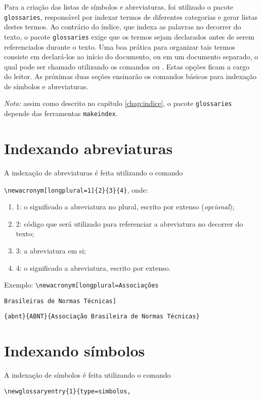 \documentclass{fei}
\begin{document}
	Para a criação das listas de símbolos e abreviaturas, foi utilizado o pacote \verb+glossaries+, responsável por indexar termos de diferentes categorias e gerar listas destes termos. Ao contrário do índice, que indexa as palavras no decorrer do texto, o pacote \verb+glossaries+ exige que os termos sejam declarados antes de serem referenciados durante o texto. Uma boa prática para organizar tais termos consiste em declará-los ao início do documento, ou em um documento separado, o qual pode ser chamado utilizando os comandos \verb++ ou \verb++. Estas opções ficam a cargo do leitor. As próximas duas seções ensinarão os comandos básicos para indexação de símbolos e abreviaturas.
	
	\emph{Nota:} assim como descrito no capítulo \ref{chap:indice}, o pacote \texttt{glossaries} depende das ferramentas \texttt{makeindex}.
	
	\section{Indexando abreviaturas}
	
	A indexação de abreviaturas é feita utilizando o comando
	
	\verb+\newacronym[longplural=1]{2}{3}{4}+, onde:
	
	\begin{enumerate}
	\item 1: o significado a abreviatura no plural, escrito por extenso (\emph{opcional});
	\item 2: código que será utilizado para referenciar a abreviatura no decorrer do texto;
	\item 3: a abreviatura em si;
	\item 4: o significado a abreviatura, escrito por extenso.
	\end{enumerate}
	
	Exemplo: \verb+\newacronym[longplural=Associações+
	
			 \verb+Brasileiras de Normas Técnicas]+
			 
			 \verb+{abnt}{ABNT}{Associação Brasileira de Normas Técnicas}+
			 
	\section{Indexando símbolos}
	
	A indexação de símbolos é feita utilizando o comando
	
	\verb+\newglossaryentry{1}{type=simbolos,+
	
\end{document}
